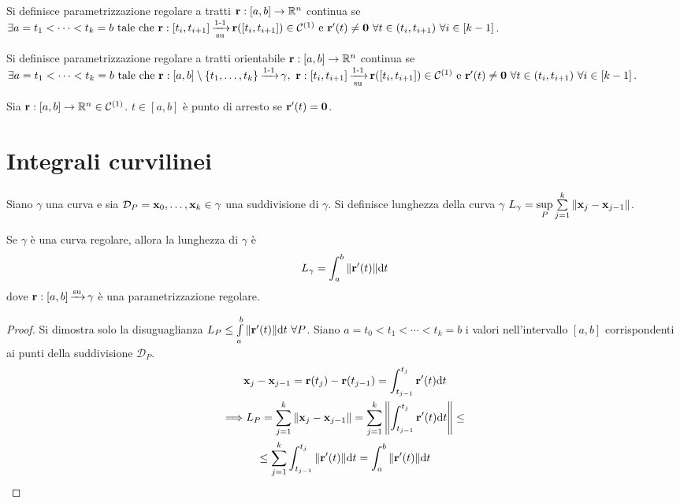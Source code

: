 \begin{definition}
	Si definisce parametrizzazione regolare a tratti $\vb{r}:[a,b]\to \mathbb{R}^n$ continua se $\exists a=t_1<\cdots<t_k=b \text{ tale che } \vb{r}:[t_i, t_{i+1}]\operatorname{\xrightarrow[\operatorname{su}]{\operatorname{1-1}}} \vb{r}([t_i,t_{i+1}]) \in \mathcal{C}^{(1)} \text{ e } \vb{r}'(t)\neq \vb{0} \ \forall t \in (t_i,t_{i+1}) \ \forall i \in [k-1]$.
\end{definition}

\begin{definition}
	Si definisce parametrizzazione regolare a tratti orientabile $\vb{r}: [a,b]\to\mathbb{R}^n$ continua se $\exists a=t_1<\cdots<t_k=b \tc \vb{r}:[a,b]\setminus \{t_1,\dots,t_k\} \injarrow \gamma, \ \vb{r}:[t_i,t_{i+1}]\bijarrow \vb{r}([t_i,t_{i+1}]) \in \C{1} \e \vb{r}'(t)\neq \vb{0} \ \forall t \in (t_i,t_{i+1}) \ \forall i \in [k-1]$.
\end{definition}

\begin{definition}
	Sia $\vb{r} :[a,b] \to \mathbb{R}^n\in \mathcal{C}^{(1)}$. $t \in [a,b]$ è punto di arresto se $\vb{r}'(t) = \vb{0}$.
\end{definition}

\section{Integrali curvilinei}

\begin{definition}
	Siano $\gamma$ una curva e sia $\mathcal{D}_P=\vb{x}_0,\dots,\vb{x}_k\in \gamma$ una suddivisione di $\gamma$. Si definisce lunghezza della curva $\gamma$ $L_\gamma = \sup\limits_{P}\sum\limits_{j=1}^{k}\norm{\vb{x}_j-\vb{x}_{j-1}}$.
\end{definition}

\begin{theorem}
	Se $\gamma$ è una curva regolare, allora la lunghezza di $\gamma$ è
	$$
		L_\gamma = \int_a^b\norm{\vb{r}'(t)}\dd t
	$$
	dove $\vb{r}: [a,b]\operatorname{\xrightarrow{\operatorname{su}}} \gamma$ è una parametrizzazione regolare.
\end{theorem}

\begin{proof}
	Si dimostra solo la disuguaglianza $L_P \leq \int\limits_{a}^{b}\norm{\vb{r}'(t)}\dd t \ \forall P$. Siano $a=t_0<t_1<\cdots<t_k=b$ i valori nell'intervallo $[a,b]$ corrispondenti ai punti della suddivisione $\mathcal{D}_P$.
	\begin{gather*}
		\vb{x}_j-\vb{x}_{j-1}=\vb{r}(t_j)-\vb{r}(t_{j-1})=\int_{t_{j-1}}^{t_j}\vb{r}'(t)\dd t\\
		\Longrightarrow L_P=\sum_{j=1}^{k}\norm{\vb{x}_j-\vb{x}_{j-1}}=\sum_{j=1}^{k}\norm{\int_{t_{j-1}}^{t_j}\vb{r}'(t)\dd t}\leq\\
		\leq\sum_{j=1}^{k}\int_{t_{j-1}}^{t_j}\norm{\vb{r}'(t)}\dd t=\int_{a}^{b}\norm{\vb{r}'(t)}\dd t
	\end{gather*}
\end{proof}


